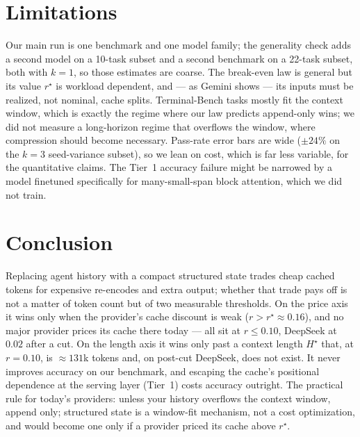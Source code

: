 \documentclass[11pt]{article}
\begin{document}
\section{Limitations}
\label{sec:limits}
Our main run is one benchmark and one model family; the generality check adds a
second model on a 10-task subset and a second benchmark on a 22-task subset,
both with $k=1$, so those estimates are coarse. The break-even law is general but
its value $r^\star$ is workload dependent, and --- as Gemini shows --- its inputs
must be realized, not nominal, cache splits. Terminal-Bench tasks mostly fit the context window, which is exactly
the regime where our law predicts append-only wins; we did not measure a
long-horizon regime that overflows the window, where compression should become
necessary. Pass-rate error bars are wide ($\pm24\%$ on the $k=3$ seed-variance
subset), so we lean on cost, which is far less variable, for the quantitative
claims. The Tier~1 accuracy failure might be narrowed by a model
finetuned specifically for many-small-span block attention, which we did not train.

\section{Conclusion}
Replacing agent history with a compact structured state trades cheap cached
tokens for expensive re-encodes and extra output; whether that trade pays off is
not a matter of token count but of two measurable thresholds. On the price axis
it wins only when the provider's cache discount is weak ($r>r^\star\approx0.16$),
and no major provider prices its cache there today --- all sit at $r\le0.10$,
DeepSeek at $0.02$ after a cut. On the length axis it wins only past a context
length $H^\star$ that, at $r=0.10$, is $\approx131$k tokens and, on post-cut
DeepSeek, does not exist. It never improves accuracy on our benchmark, and
escaping the cache's positional dependence at the serving layer (Tier~1) costs
accuracy outright. The practical rule for today's providers: unless your history
overflows the context window, append only; structured state is a window-fit
mechanism, not a cost optimization, and would become one only if a provider
priced its cache above $r^\star$.
\end{document}
